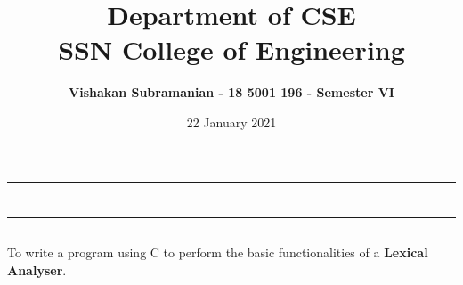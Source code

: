 \documentclass[12pt, a4]{article}
\title{\textbf{Department of CSE\\SSN College of Engineering}}
\author{\textbf{Vishakan Subramanian - 18 5001 196 - Semester VI}}
\date{22 January 2021}
\begin{document}
\maketitle
\hrule
\section*{}
\hrule
\bigskip

\subsection*{}
\subsection*{}
\begin{flushleft}
To write a program using C to perform the
basic functionalities of a \textbf{Lexical Analyser}.
\end{flushleft}

\newpage
\subsection*{}
\begin{flushleft}

\end{flushleft}

\newpage
\subsection*{}
\begin{flushleft}

\end{flushleft}

\newpage
\subsection*{}
\begin{flushleft}

\end{flushleft}
\end{document}
